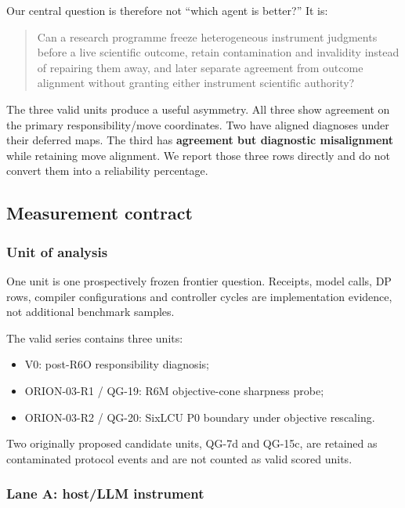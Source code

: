 \documentclass[10pt]{article}
\providecommand{\tightlist}{%
  \setlength{\itemsep}{0pt}\setlength{\parskip}{0pt}}
\begin{document}
Our central question is therefore not ``which agent is better?'' It is:

\begin{quote}
Can a research programme freeze heterogeneous instrument judgments
before a live scientific outcome, retain contamination and invalidity
instead of repairing them away, and later separate agreement from
outcome alignment without granting either instrument scientific
authority?
\end{quote}

The three valid units produce a useful asymmetry. All three show
agreement on the primary responsibility/move coordinates. Two have
aligned diagnoses under their deferred maps. The third has
\textbf{agreement but diagnostic misalignment} while retaining move
alignment. We report those three rows directly and do not convert them
into a reliability percentage.

\hypertarget{measurement-contract}{%
\subsection{Measurement contract}\label{measurement-contract}}

\hypertarget{unit-of-analysis}{%
\subsubsection{Unit of analysis}\label{unit-of-analysis}}

One unit is one prospectively frozen frontier question. Receipts, model
calls, DP rows, compiler configurations and controller cycles are
implementation evidence, not additional benchmark samples.

The valid series contains three units:

\begin{itemize}
\tightlist
\item
  V0: post-R6O responsibility diagnosis;
\item
  ORION-03-R1 / QG-19: R6M objective-cone sharpness probe;
\item
  ORION-03-R2 / QG-20: SixLCU P0 boundary under objective rescaling.
\end{itemize}

Two originally proposed candidate units, QG-7d and QG-15c, are retained
as contaminated protocol events and are not counted as valid scored
units.

\hypertarget{lane-a-hostllm-instrument}{%
\subsubsection{Lane A: host/LLM
instrument}\label{lane-a-hostllm-instrument}}
\end{document}
